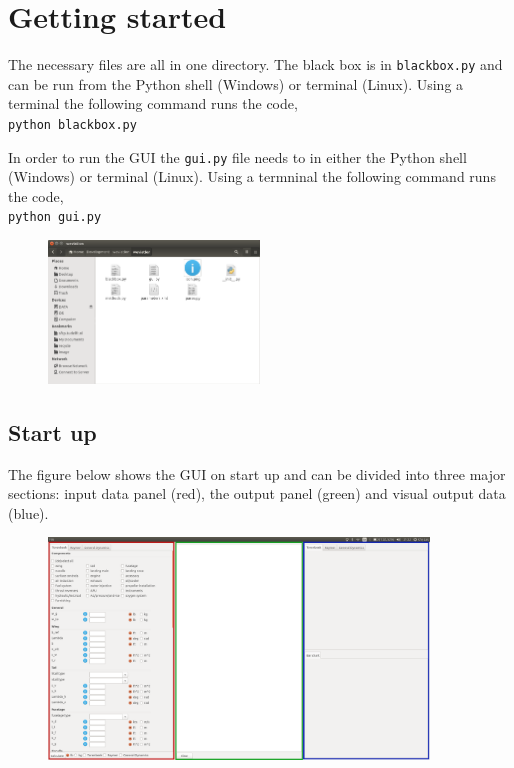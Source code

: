 \section{Getting started}
\label{sec:gstarted}

The necessary files are all in one directory.
The black box is in \texttt{blackbox.py} and can be run from the Python shell (Windows) or terminal (Linux). Using a terminal the following command runs the code,\\
\indent \texttt{python blackbox.py}

\noindent In order to run the GUI the \texttt{gui.py} file needs to in either the Python shell (Windows) or terminal (Linux). Using a termninal the following command runs the code,\\
\indent \texttt{python gui.py}\\
\begin{figure}[h]
\includegraphics[width=0.5\textwidth]{image/directory.png}
\end{figure}

\subsection{Start up}
\noindent The figure below shows the GUI on start up and can be divided into three major sections: input data panel (red), the output panel (green) and visual output data (blue).

\begin{figure}[h]
\includegraphics[width=0.9\textwidth]{image/gui_startup_colours.png}
\end{figure}

